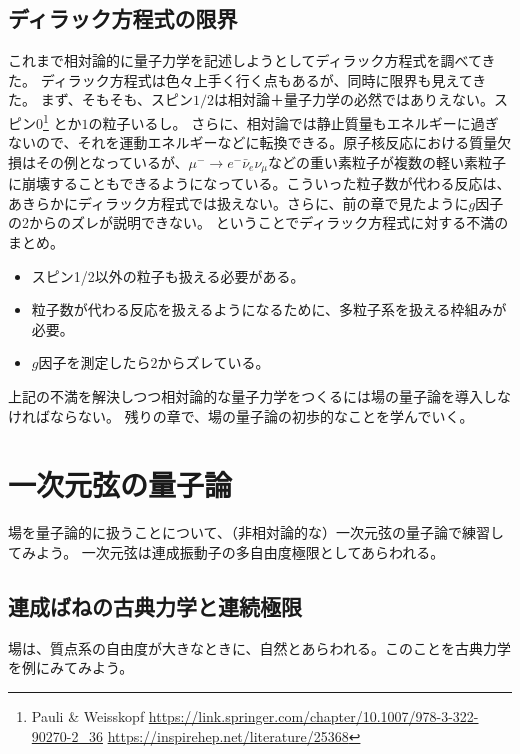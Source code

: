 \documentclass[10pt,a4paper]{jarticle}
\begin{document}
\subsection{ディラック方程式の限界}
これまで相対論的に量子力学を記述しようとしてディラック方程式を調べてきた。
ディラック方程式は色々上手く行く点もあるが、同時に限界も見えてきた。
まず、そもそも、スピン$1/2$は相対論＋量子力学の必然ではありえない。スピン$0$\footnote{Pauli \& Weisskopf
\url{https://link.springer.com/chapter/10.1007/978-3-322-90270-2_36}
\url{https://inspirehep.net/literature/25368}}
とか$1$の粒子いるし。
さらに、相対論では静止質量もエネルギーに過ぎないので、それを運動エネルギーなどに転換できる。原子核反応における質量欠損はその例となっているが、$\mu^- \to e^- \bar \nu_e \nu_\mu$などの重い素粒子が複数の軽い素粒子に崩壊することもできるようになっている。こういった粒子数が代わる反応は、あきらかにディラック方程式では扱えない。さらに、前の章で見たように$g$因子の2からのズレが説明できない。
ということでディラック方程式に対する不満のまとめ。
\begin{itemize}
\item スピン1/2以外の粒子も扱える必要がある。
\item 粒子数が代わる反応を扱えるようになるために、多粒子系を扱える枠組みが必要。
\item $g$因子を測定したら$2$からズレている。
\end{itemize}
上記の不満を解決しつつ相対論的な量子力学をつくるには場の量子論を導入しなければならない。
残りの章で、場の量子論の初歩的なことを学んでいく。






\section{一次元弦の量子論}
場を量子論的に扱うことについて、（非相対論的な）一次元弦の量子論で練習してみよう。
一次元弦は連成振動子の多自由度極限としてあらわれる。


\subsection{連成ばねの古典力学と連続極限}
場は、質点系の自由度が大きなときに、自然とあらわれる。このことを古典力学を例にみてみよう。
\end{document}
